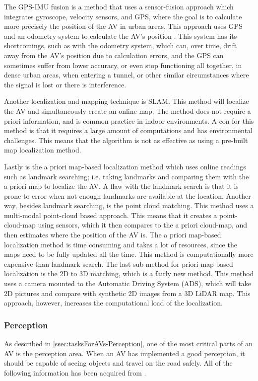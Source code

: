 The GPS-IMU fusion is a method that uses a sensor-fusion approach which integrates gyroscope, velocity sensors, and GPS, where the goal is to calculate more precisely the position of the AV in urban areas.
This approach uses GPS and an odometry system to calculate the AV's position \cite{zhang_sensor_2012}.
This system has its shortcomings, such as with the odometry system, which can, over time, drift away from the AV's position due to calculation errors, and the GPS can sometimes suffer from lower accuracy, or even stop functioning all together, in dense urban areas, when entering a tunnel, or other similar circumstances where the signal is lost or there is interference.
\cite{yurtsever_survey_2019}

Another localization and mapping technique is SLAM.
This method will localize the AV and simultaneously create an online map.
The method does not require a priori information, and is common practice in indoor environments.
A con for this method is that it requires a large amount of computations and has environmental challenges.
This means that the algorithm is not as effective as using a pre-built map localization method.
\cite{yurtsever_survey_2019}

Lastly is the a priori map-based localization method which uses online readings such as landmark searching; i.e. taking landmarks and comparing them with the a priori map to localize the AV.
A flaw with the landmark search is that it is prone to error when not enough landmarks are available at the location.
Another way, besides landmark searching, is the point cloud matching.
This method uses a multi-modal point-cloud based approach.
This means that it creates a point-cloud-map using sensors, which it then compares to the a priori cloud-map, and then estimates where the position of the AV is.
The a priori map-based localization method is time consuming and takes a lot of resources, since the maps need to be fully updated all the time.
This method is computationally more expensive than landmark search.
The last sub-method for priori map-based localization is the 2D to 3D matching, which is a fairly new method.
This method uses a camera mounted to the Automatic Driving System (ADS), which will take 2D pictures and compare with synthetic 2D images from a 3D LiDAR map.
This approach, however, increases the computational load of the localization.
\cite{yurtsever_survey_2019}

\subsubsection{Perception}
As described in \autoref{ssec:tasksForAVs-Perception}, one of the most critical parts of an AV is the perception area.
When an AV has implemented a good perception, it should be capable of seeing objects and travel on the road safely.
All of the following information has been acquired from \cite{yurtsever_survey_2019}.

